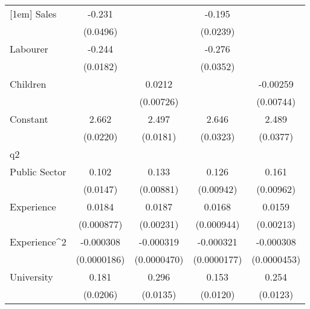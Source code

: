 {\begin{tabular}{l*{4}{c}}
[1em]
Sales               &      -0.231\sym{***}&                     &      -0.195\sym{***}&                     \\
                    &    (0.0496)         &                     &    (0.0239)         &                     \\
[1em]
Labourer            &      -0.244\sym{***}&                     &      -0.276\sym{***}&                     \\
                    &    (0.0182)         &                     &    (0.0352)         &                     \\
[1em]
Children            &                     &      0.0212\sym{**} &                     &    -0.00259         \\
                    &                     &   (0.00726)         &                     &   (0.00744)         \\
[1em]
Constant            &       2.662\sym{***}&       2.497\sym{***}&       2.646\sym{***}&       2.489\sym{***}\\
                    &    (0.0220)         &    (0.0181)         &    (0.0323)         &    (0.0377)         \\
\hline
q2                  &                     &                     &                     &                     \\
Public Sector       &       0.102\sym{***}&       0.133\sym{***}&       0.126\sym{***}&       0.161\sym{***}\\
                    &    (0.0147)         &   (0.00881)         &   (0.00942)         &   (0.00962)         \\
[1em]
Experience          &      0.0184\sym{***}&      0.0187\sym{***}&      0.0168\sym{***}&      0.0159\sym{***}\\
                    &  (0.000877)         &   (0.00231)         &  (0.000944)         &   (0.00213)         \\
[1em]
Experience^{2}      &   -0.000308\sym{***}&   -0.000319\sym{***}&   -0.000321\sym{***}&   -0.000308\sym{***}\\
                    & (0.0000186)         & (0.0000470)         & (0.0000177)         & (0.0000453)         \\
[1em]
University          &       0.181\sym{***}&       0.296\sym{***}&       0.153\sym{***}&       0.254\sym{***}\\
                    &    (0.0206)         &    (0.0135)         &    (0.0120)         &    (0.0123)         \\

\end{tabular}}
